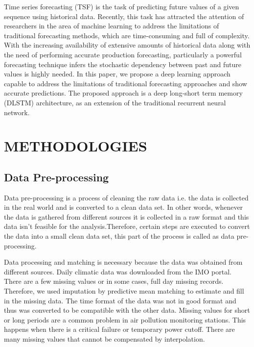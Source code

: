 Time series forecasting (TSF) is the task of predicting future values of a given sequence using historical data. Recently, this task has attracted the attention of researchers in the area of machine learning to address the limitations of traditional forecasting methods, which are time-consuming and full of complexity. With the increasing availability of extensive amounts of historical data along with the need of performing accurate production forecasting, particularly a powerful forecasting technique infers the stochastic dependency between past and future values is highly needed. In this paper, we propose a deep learning approach capable to address the limitations of traditional forecasting approaches and show accurate predictions. The proposed approach is a deep long-short term memory (DLSTM) architecture, as an extension of the traditional recurrent neural network. 


\chapter{METHODOLOGIES}  %

\section {Data Pre-processing}
Data pre-processing is a process of cleaning the raw data i.e. the data is collected in the real world and is converted to a clean data set. In other words, whenever the data is gathered from different sources it is collected in a raw format and this data isn't feasible for the analysis.Therefore, certain steps are executed to convert the data into a small clean data set, this part of the process is called as data pre-processing.\par
Data processing and matching is necessary
because the data was obtained from different
sources. Daily climatic data was downloaded
from the IMO portal. There are a few missing
values or in some cases, full day missing records.
Therefore, we used imputation by predictive
mean matching to estimate and fill in the missing
data. The time format of the data was not in good
format and thus was converted to be compatible
with the other data. Missing values for short or
long periods are a common problem in air
pollution monitoring stations. This happens when
there is a critical failure or temporary power
cutoff. There are many missing values that cannot
be compensated by interpolation.
\pagebreak

